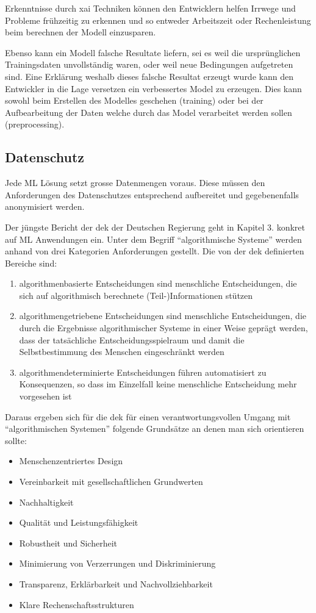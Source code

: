 \documentclass[
  12pt, %
  a4paper, %
  oneside, %
  openany, 
  numbers=noenddot, %
  BCOR=5mm, %
  parskip=half*, %
  thesis, %
]{bfhbook}
\begin{document}
Erkenntnisse durch \gls{xai} Techniken können den Entwicklern helfen Irrwege und Probleme frühzeitig zu erkennen und so entweder Arbeitszeit oder Rechenleistung beim berechnen der Modell einzusparen.

Ebenso kann ein Modell falsche Resultate liefern, sei es weil die ursprünglichen Trainingsdaten unvollständig waren, oder weil neue Bedingungen aufgetreten sind. Eine Erklärung weshalb dieses falsche Resultat erzeugt wurde kann den Entwickler in die Lage versetzen ein verbessertes Model zu erzeugen. Dies kann sowohl beim Erstellen des Modelles geschehen (training) oder bei der Aufbearbeitung der Daten welche durch das Model verarbeitet werden sollen (preprocessing).

\subsection{Datenschutz}
Jede \Gls{ML} Lösung setzt grosse Datenmengen voraus. Diese müssen den Anforderungen des Datenschutzes entsprechend aufbereitet und gegebenenfalls anonymisiert werden.

Der jüngste Bericht der \acrfull{dek} der Deutschen Regierung \parencite{datenEthik} geht in Kapitel 3. konkret auf  \Gls{ML} Anwendungen ein.
\break
Unter dem Begriff ``algorithmische Systeme'' werden anhand von drei Kategorien Anforderungen gestellt.
\break
 Die von der  \acrshort{dek} definierten Bereiche sind:
 
 \begin{enumerate}
   \item  algorithmenbasierte Entscheidungen sind menschliche Entscheidungen, die sich auf algorithmisch berechnete (Teil-)Informationen stützen
   \item algorithmengetriebene Entscheidungen sind menschliche Entscheidungen, die durch die Ergebnisse algorithmischer Systeme in einer Weise geprägt werden, dass der tatsächliche Entscheidungsspielraum und damit die Selbstbestimmung des Menschen eingeschränkt werden
   \item  algorithmendeterminierte Entscheidungen führen automatisiert zu Konsequenzen, so dass im Einzelfall keine menschliche Entscheidung mehr vorgesehen ist
\end{enumerate}

Daraus ergeben sich für die \acrlong{dek} für einen verantwortungsvollen Umgang mit ``algorithmischen Systemen'' folgende Grundsätze an denen man sich orientieren sollte:

\begin{itemize}
	\item Menschenzentriertes Design
	\item Vereinbarkeit mit gesellschaftlichen Grundwerten
	\item Nachhaltigkeit
	\item Qualität und Leistungsfähigkeit
	\item Robustheit und Sicherheit
	\item Minimierung von Verzerrungen und Diskriminierung
	\item Transparenz, Erklärbarkeit und Nachvollziehbarkeit
	\item Klare Rechenschaftsstrukturen
\end{itemize}
\end{document}
